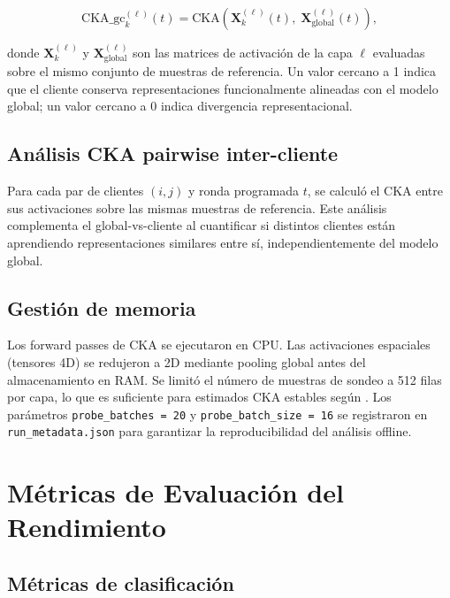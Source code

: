 \begin{equation}
  \text{CKA\_gc}_{k}^{(\ell)}(t) = \text{CKA}\!\left(
    \mathbf{X}_{k}^{(\ell)}(t),\; \mathbf{X}_{\text{global}}^{(\ell)}(t)
  \right),
  \label{eq:cka_gc}
\end{equation}

donde $\mathbf{X}_{k}^{(\ell)}$ y $\mathbf{X}_{\text{global}}^{(\ell)}$ son las matrices de
activación de la capa $\ell$ evaluadas sobre el mismo conjunto de muestras de referencia.
Un valor cercano a 1 indica que el cliente conserva representaciones funcionalmente alineadas
con el modelo global; un valor cercano a 0 indica divergencia representacional.

\subsection{Análisis CKA pairwise inter-cliente}

Para cada par de clientes $(i, j)$ y ronda programada $t$, se calculó el CKA entre sus
activaciones sobre las mismas muestras de referencia. Este análisis complementa el
global-vs-cliente al cuantificar si distintos clientes están aprendiendo representaciones
similares entre sí, independientemente del modelo global.

\subsection{Gestión de memoria}

Los forward passes de CKA se ejecutaron en CPU. Las activaciones espaciales (tensores 4D)
se redujeron a 2D mediante pooling global antes del almacenamiento en RAM. Se limitó el
número de muestras de sondeo a 512 filas por capa, lo que es suficiente para estimados CKA
estables según \cite{DBLP:journals/corr/abs-1905-00414}. Los parámetros
\texttt{probe\_batches = 20} y \texttt{probe\_batch\_size = 16} se registraron en
\texttt{run\_metadata.json} para garantizar la reproducibilidad del análisis offline.

\section{Métricas de Evaluación del Rendimiento}

\subsection{Métricas de clasificación}

